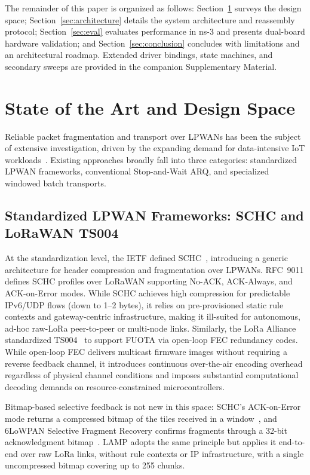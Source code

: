 \documentclass[journal]{IEEEtran}
\begin{document}
The remainder of this paper is organized as follows: Section~\ref{sec:state_of_art} surveys the design space; Section~\ref{sec:architecture} details the system architecture and reassembly protocol; Section~\ref{sec:eval} evaluates performance in ns-3 and presents dual-board hardware validation; and Section~\ref{sec:conclusion} concludes with limitations and an architectural roadmap. Extended driver bindings, state machines, and secondary sweeps are provided in the companion Supplementary Material.

\section{State of the Art and Design Space}
\label{sec:state_of_art}
Reliable packet fragmentation and transport over \acp{LPWAN} has been the subject of extensive investigation, driven by the expanding demand for data-intensive \ac{IoT} workloads~\cite{multimedia-lora-survey, dare-lorawan}. Existing approaches broadly fall into three categories: standardized LPWAN frameworks, conventional Stop-and-Wait ARQ, and specialized windowed batch transports.

\subsection{Standardized LPWAN Frameworks: SCHC and LoRaWAN TS004}
At the standardization level, the IETF defined \ac{SCHC}~\cite{rfc8724, rfc9011}, introducing a generic architecture for header compression and fragmentation over LPWANs. RFC~9011 defines SCHC profiles over LoRaWAN supporting No-ACK, ACK-Always, and ACK-on-Error modes. While SCHC achieves high compression for predictable IPv6/UDP flows (down to 1--2 bytes), it relies on pre-provisioned static rule contexts and gateway-centric infrastructure, making it ill-suited for autonomous, ad-hoc raw-\ac{LoRa} peer-to-peer or multi-node links. Similarly, the \ac{LoRa} Alliance standardized \ac{TS004}~\cite{ts004} to support \ac{FUOTA} via open-loop \ac{FEC} redundancy codes. While open-loop \ac{FEC} delivers multicast firmware images without requiring a reverse feedback channel, it introduces continuous over-the-air encoding overhead regardless of physical channel conditions and imposes substantial computational decoding demands on resource-constrained microcontrollers.

Bitmap-based selective feedback is not new in this space: SCHC's ACK-on-Error mode returns a compressed bitmap of the tiles received in a window~\cite{rfc9011}, and 6LoWPAN Selective Fragment Recovery confirms fragments through a 32-bit acknowledgment bitmap~\cite{rfc8931}. LAMP adopts the same principle but applies it end-to-end over raw \ac{LoRa} links, without rule contexts or IP infrastructure, with a single uncompressed bitmap covering up to 255 chunks.
\end{document}
